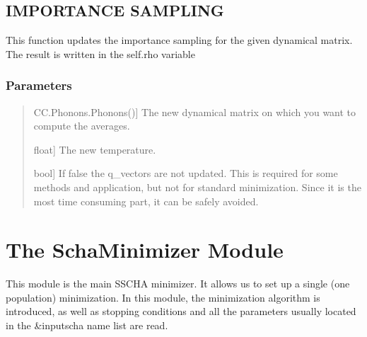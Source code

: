 \documentclass[a4paper,11pt,english]{sphinxmanual}
\begin{document}
\begin{fulllineitems}
\begin{fulllineitems}
\label{\detokenize{apireference:sscha.Ensemble.Ensemble.update_weights}}
\pysigstartsignatures
{}
\pysigstopsignatures

\subsection{IMPORTANCE SAMPLING}
\label{\detokenize{apireference:importance-sampling}}
\sphinxAtStartPar
This function updates the importance sampling for the given dynamical matrix.
The result is written in the self.rho variable


\subsubsection{Parameters}
\label{\detokenize{apireference:id29}}\begin{quote}
\begin{description}
\sphinxlineitem{new\_dynamical\_matrix}{[}CC.Phonons.Phonons(){]}
\sphinxAtStartPar
The new dynamical matrix on which you want to compute the averages.

\sphinxlineitem{new\_T}{[}float{]}
\sphinxAtStartPar
The new temperature.

\sphinxlineitem{update\_q}{[}bool{]}
\sphinxAtStartPar
If false the q\_vectors are not updated. This is required for some
methods and application, but not for standard minimization.
Since it is the most time consuming part, it can be safely avoided.

\end{description}
\end{quote}

\end{fulllineitems}


\end{fulllineitems}



\section{The SchaMinimizer Module}
\label{\detokenize{apireference:the-schaminimizer-module}}
\sphinxAtStartPar
This module is the main SSCHA minimizer. It allows us to set up a single (one population) minimization.
In this module, the minimization algorithm is introduced, as well as stopping conditions and all the parameters
usually located in the \&inputscha name list are read.
\end{document}
